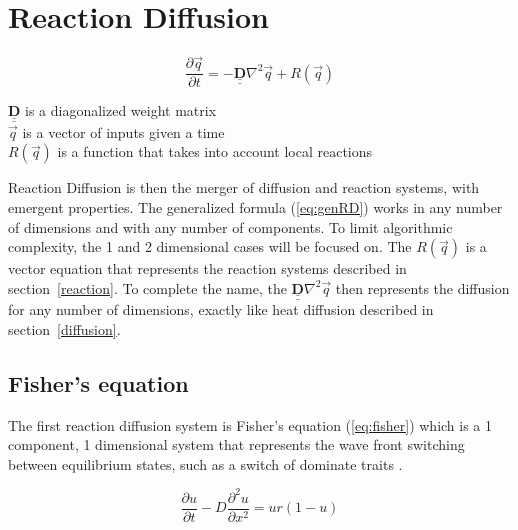 \documentclass[12pt, letterpaper]{article}
\begin{document}
\section{Reaction Diffusion} \label{reactiondiffusion}

\begin{singlespace}
  \begin{equation}
    \label{eq:genRD}
    \frac{\partial \vec{q}}{\partial t} = − \underline{\underline{\mathbf{D}}} \nabla^2 \vec{q} + R(\vec{q})
  \end{equation}
  \begin{small}
    $\underline{\underline{\mathbf{D}}}$ is a diagonalized weight matrix \\
    $\vec{q}$ is a vector of inputs given a time \\
    $R(\vec{q})$ is a function that takes into account local reactions
  \end{small}
\end{singlespace}

Reaction Diffusion is then the merger of diffusion and reaction systems, with emergent properties. The
generalized formula (\ref{eq:genRD}) works in any number of dimensions and with any number of components. To
limit algorithmic complexity, the 1 and 2 dimensional cases will be focused on. The $R(\vec{q})$ is a vector
equation that represents the reaction systems described in section~\ref{reaction}. To complete the name, the 
$\underline{\underline{\mathbf{D}}} \nabla^2 \vec{q}$ then represents the diffusion for any number of
dimensions, exactly like heat diffusion described in section~\ref{diffusion}.

\subsection{Fisher's equation} \label{fisher}
The first reaction diffusion system is Fisher's equation (\ref{eq:fisher}) which is a 1 component, 1
dimensional system that represents the wave front switching between equilibrium states, such as a switch of
dominate traits \citep{fisher}.

\begin{equation}
  \label{eq:fisher}
  \frac{\partial u}{\partial t} - D \frac{\partial^2 u}{\partial x^2} = ur(1 - u) 
\end{equation}
\end{document}
